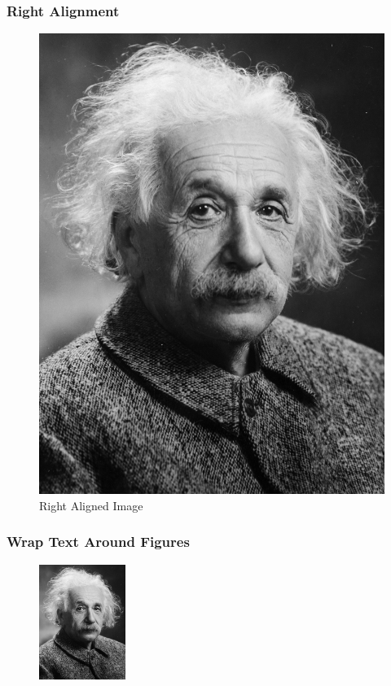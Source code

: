\documentclass{article}
\begin{document}
\subsubsection{Right Alignment}
\begin{figure}[htbp]
    \hfill      %
    \includegraphics[]{Images/Albert_Einstein.png}
    \caption{Right Aligned Image}
    \label{fig:enter-label}
\end{figure}
\pagebreak


\subsubsection{Wrap Text Around Figures}
\begin{figure}  %
    \centering
    \includegraphics[width=0.25\textwidth]{Images/Albert_Einstein.png}
\end{figure}
\end{document}

